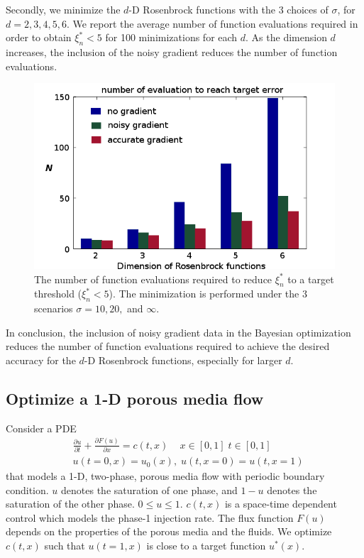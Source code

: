 \documentclass[a4paper,onecolumn]{article}
\theoremstyle{remark}
\begin{document}
Secondly, we minimize the $d$-D Rosenbrock functions with the 3 choices of $\sigma$, for 
$d= 2,3,4,5,6$. We report the average number of function evaluations required in order to 
obtain $\xi^*_n<5$ for 100 minimizations for each $d$. 
As the dimension $d$ increases, the inclusion of the noisy gradient
reduces the number of function evaluations.
\begin{figure}\begin{center}
    \includegraphics[width=13cm]{compare_bar_2.png}
    \caption{The number of function evaluations required to reduce $\xi^*_n$ to a
             target threshold ($\xi^*_n<5$). The minimization is performed under the 3
             scenarios $\sigma=10, 20,$ and $\infty$.}
    \label{fig:compare_bar}
\end{center}
\end{figure}

In conclusion, the inclusion of noisy gradient data in the Bayesian optimization reduces
the number of function evaluations required to achieve the desired accuracy
for the $d$-D Rosenbrock functions, especially for larger $d$.\\

\subsection{Optimize a 1-D porous media flow}
Consider a PDE 
\begin{equation}\begin{split}
    &\frac{\partial u}{\partial t} + \frac{\partial F(u)}{\partial x} = c(t,x)\,
    \quad x\in[0,1]\; t\in[0,1]\\
    &u(t=0,x) =u_0(x),\; u(t,x=0)=u(t,x=1)
    \label{BL eqn}
\end{split}\end{equation}
that models a 1-D, two-phase, porous media flow with periodic boundary condition. 
$u$ denotes the saturation of
one phase, and $1-u$ denotes the saturation of the other phase.
$0\le u\le 1$. $c(t,x)$ is a space-time dependent control which models the phase-1
injection rate.
The flux function $F(u)$ depends on the properties of the porous media and the fluids.
We optimize $c(t,x)$ 
such that $u(t=1,x)$ is close to a target function $u^*(x)$. \\
\end{document}
